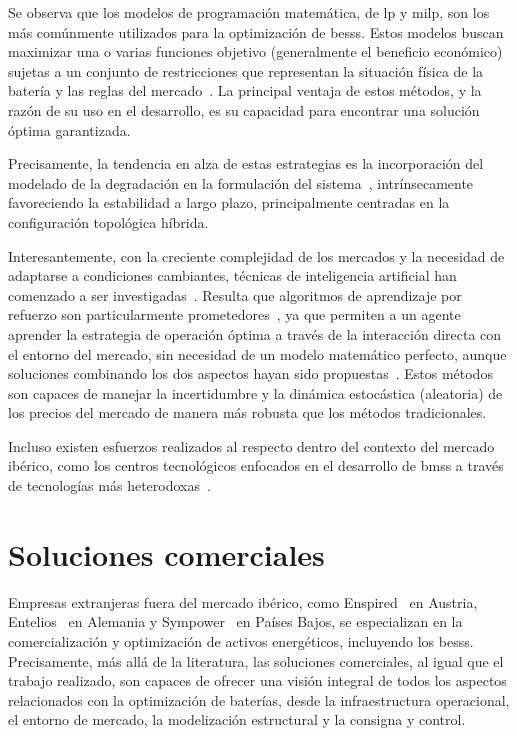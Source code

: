 Se observa que los modelos de programación matemática, de \gls{lp} y \gls{milp}, son los más comúnmente utilizados para la optimización de \glspl{bess}. Estos modelos buscan maximizar una o varias funciones objetivo (generalmente el beneficio económico) sujetas a un conjunto de restricciones que representan la situación física de la batería y las reglas del mercado~\cite{mendoza2023review}. La principal ventaja de estos métodos, y la razón de su uso en el desarrollo, es su capacidad para encontrar una solución óptima garantizada.

Precisamente, la tendencia en alza de estas estrategias es la incorporación del modelado de la degradación en la formulación del sistema~\cite{liu2022milp, minh2024mixed, spiller2020aging}, intrínsecamente favoreciendo la estabilidad a largo plazo, principalmente centradas en la configuración topológica híbrida.

Interesantemente, con la creciente complejidad de los mercados y la necesidad de adaptarse a condiciones cambiantes, técnicas de inteligencia artificial han comenzado a ser investigadas~\cite{haratian2024machine, krishna2024advanced}. Resulta que algoritmos de aprendizaje por refuerzo son particularmente prometedores~\cite{dong2021strategic}, ya que permiten a un agente aprender la estrategia de operación óptima a través de la interacción directa con el entorno del mercado, sin necesidad de un modelo matemático perfecto, aunque soluciones combinando los dos aspectos hayan sido propuestas~\cite{georgiadis2025hybrid}. Estos métodos son capaces de manejar la incertidumbre y la dinámica estocástica (aleatoria) de los precios del mercado de manera más robusta que los métodos tradicionales.

Incluso existen esfuerzos realizados al respecto dentro del contexto del mercado ibérico, como los centros tecnológicos enfocados en el desarrollo de \glspl{bms} a través de tecnologías más heterodoxas~\cite{ikerlan2025bateria}.

\section{Soluciones comerciales}%
\label{makereference2.3}

Empresas extranjeras fuera del mercado ibérico, como Enspired~\cite{enspired2025battery} en Austria, Entelios~\cite{entelios2025cross} en Alemania y Sympower~\cite{sympower2025battery} en Países Bajos, se especializan en la comercialización y optimización de activos energéticos, incluyendo los \glspl{bess}. Precisamente, más allá de la literatura, las soluciones comerciales, al igual que el trabajo realizado, son capaces de ofrecer una visión integral de todos los aspectos relacionados con la optimización de baterías, desde la infraestructura operacional, el entorno de mercado, la modelización estructural y la consigna y control.

